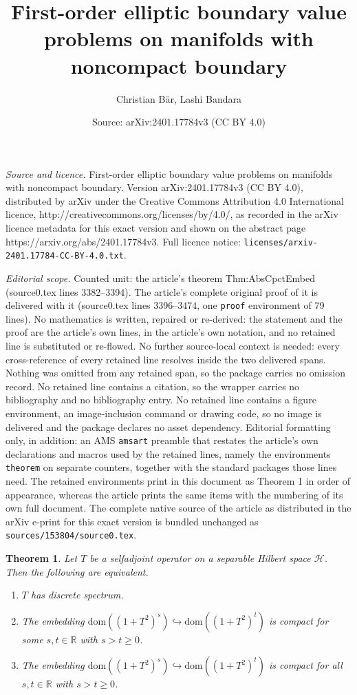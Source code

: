 \documentclass[10pt,a4paper]{amsart}
\title{First-order elliptic boundary value problems on manifolds with noncompact boundary}
\author{Christian Bär, Lashi Bandara}
\date{Source: arXiv:2401.17784v3 (CC BY 4.0)}
\newtheorem{theorem}{Theorem}
\newcommand{\Hil}{\mathscr{H}}
\newcommand{\R}{\mathbb{R}}
\newcommand{\dom}{\mathrm{dom}}
\newcommand{\embed}{\hookrightarrow}%
\begin{document}
\maketitle

\noindent\emph{Source and licence.} First-order elliptic boundary value problems on manifolds with noncompact boundary. Version arXiv:2401.17784v3 (CC BY 4.0), distributed by arXiv under the Creative Commons Attribution 4.0 International licence, http://creativecommons.org/licenses/by/4.0/, as recorded in the arXiv licence metadata for this exact version and shown on the abstract page https://arxiv.org/abs/2401.17784v3. Full licence notice: \texttt{licenses/arxiv-2401.17784-CC-BY-4.0.txt}.\par\smallskip

\noindent\textit{Editorial scope.} Counted unit: the article's theorem Thm:AbsCpctEmbed (source0.tex lines 3382--3394). The article's complete original proof of it is delivered with it (source0.tex lines 3396--3474, one \texttt{proof} environment of 79 lines). No mathematics is written, repaired or re-derived: the statement and the proof are the article's own lines, in the article's own notation, and no retained line is substituted or re-flowed.  No further source-local context is needed: every cross-reference of every retained line resolves inside the two delivered spans.  Nothing was omitted from any retained span, so the package carries no omission record.  No retained line contains a citation, so the wrapper carries no bibliography and no bibliography entry.  No retained line contains a figure environment, an image-inclusion command or drawing code, so no image is delivered and the package declares no asset dependency.  Editorial formatting only, in addition: an AMS \texttt{amsart} preamble that restates the article's own declarations and macros used by the retained lines, namely the environments \texttt{theorem} on separate counters, together with the standard packages those lines need.  The retained environments print in this document as Theorem 1 in order of appearance, whereas the article prints the same items with the numbering of its own full document.  The complete native source of the article as distributed in the arXiv e-print for this exact version is bundled unchanged as \texttt{sources/153804/source0.tex}.
\begin{theorem}
\label{Thm:AbsCpctEmbed}
Let $T$ be a selfadjoint operator on a separable Hilbert space $\Hil$.
Then the following are equivalent.
\begin{enumerate}[label=(\roman*), labelwidth=0pt, labelindent=2pt, leftmargin=21pt]
\item \label{It:AbsCpctEmbed:1}
$T$ has discrete spectrum.
\item \label{It:AbsCpctEmbed:2} 
The embedding $\dom((1+T^2)^s) \embed \dom((1+T^2)^t)$ is compact for some $s, t \in \R$ with $s > t\ge0$.
\item  \label{It:AbsCpctEmbed:3} 
The embedding $\dom((1+T^2)^s) \embed \dom((1+T^2)^t)$ is compact for all $s, t \in \R$ with $s > t\ge0$.
\end{enumerate}
\end{theorem}
\end{document}
